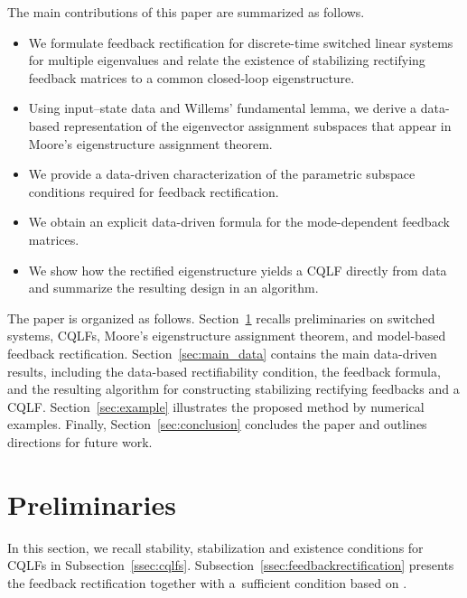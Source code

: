 \documentclass[11pt]{article}
\theoremstyle{plain}
\theoremstyle{definition}
\theoremstyle{remark}
\begin{document}
The main contributions of this paper are summarized as follows.
\begin{itemize}
    \item We formulate feedback rectification for discrete-time switched linear systems for multiple eigenvalues and relate the existence of stabilizing rectifying feedback matrices to a common closed-loop eigenstructure.
    \item Using input--state data and Willems' fundamental lemma, we derive a data-based representation of the eigenvector assignment subspaces that appear in Moore's eigenstructure assignment theorem.
    \item We provide a data-driven characterization of the parametric subspace conditions required for feedback rectification.
    \item We obtain an explicit data-driven formula for the mode-dependent feedback matrices.
    \item We show how the rectified eigenstructure yields a CQLF directly from data and summarize the resulting design in an algorithm.
\end{itemize}

The paper is organized as follows. Section~\ref{sec:prelim} recalls preliminaries on switched systems, CQLFs, Moore's eigenstructure assignment theorem, and model-based feedback rectification. Section~\ref{sec:main_data} contains the main data-driven results, including the data-based rectifiability condition, the feedback formula, and the resulting algorithm for constructing stabilizing rectifying feedbacks and a CQLF. Section~\ref{sec:example} illustrates the proposed method by numerical examples. Finally, Section~\ref{sec:conclusion} concludes the paper and outlines directions for future work.

\section{Preliminaries}
\label{sec:prelim}
In this section, we recall stability, stabilization and existence conditions for CQLFs in Subsection~\ref{ssec:cqlfs}. Subsection~\ref{ssec:feedbackrectification} presents the feedback rectification together with a~sufficient condition based on  \cite{HoneckerGWTR24}.
\end{document}
